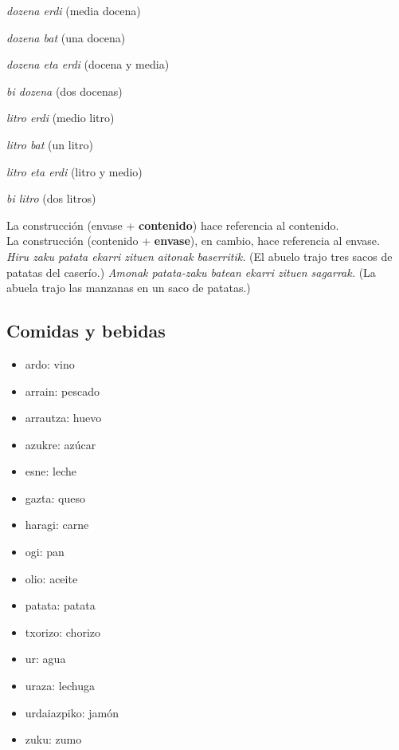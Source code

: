 \documentclass[11pt, a4paper]{article}
\begin{document}
\begin{itemize}
\begin{multicols}{2}
\item \textit{dozena erdi} (media docena)
\item \textit{dozena bat} (una docena)
\item \textit{dozena eta erdi} (docena y media)
\item \textit{bi dozena} (dos docenas)
\item \textit{litro erdi} (medio litro)
\item \textit{litro bat} (un litro)
\item \textit{litro eta erdi} (litro y medio)
\item \textit{bi litro} (dos litros)
\end{multicols}
\end{itemize}

\noindent La construcci\'on (envase + \textbf{contenido}) hace referencia al contenido. \\ \noindent La construcción (contenido + \textbf{envase}), en cambio, hace referencia al envase.\\
\indent \textit{Hiru zaku patata ekarri zituen aitonak baserritik.} (El abuelo trajo tres sacos de patatas del caserío.)
\indent \textit{Amonak patata-zaku batean ekarri zituen sagarrak.} (La abuela trajo las manzanas en un saco de patatas.)

\subsection{Comidas y bebidas}
\begin{multicols}{2}
\begin{itemize}
\item ardo: vino
\item arrain: pescado
\item arrautza: huevo
\item azukre: azúcar
\item esne: leche
\item gazta: queso
\item haragi: carne
\item ogi: pan
\item olio: aceite
\item patata: patata
\item txorizo: chorizo
\item ur: agua
\item uraza: lechuga
\item urdaiazpiko: jamón
\item zuku: zumo
\end{itemize}
\end{multicols}
\end{document}

